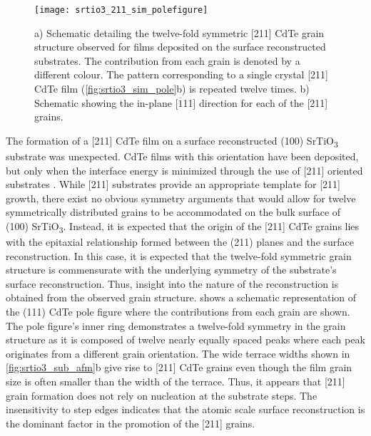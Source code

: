 \begin{figure}
 \centering \texttt{[image: srtio3\_211\_sim\_polefigure]}
 \caption[Simulated pole figure of CdTe on reconstructed SrTiO\textsubscript{3}]{\label{fig:srtio3_211_sim_polefigure}a) Schematic detailing the twelve-fold symmetric [211] CdTe grain structure observed for films deposited on the surface reconstructed substrates.
  The contribution from each grain is denoted by a different colour.
  The pattern corresponding to a single crystal [211] CdTe film (\cref{fig:srtio3_sim_pole}b) is repeated twelve times.
  b) Schematic showing the in-plane [\(\overline{1}\)11] direction for each of the [211] grains.}
\end{figure}

The formation of a [211] CdTe film on a surface reconstructed (100) SrTiO\textsubscript{3} substrate was unexpected.
CdTe films with this orientation have been deposited, but only when the interface energy is minimized through the use of [211] oriented substrates \cite{Lange1991b,Million1996,Rujirawat1997a,Zanatta1998}.
While [211] substrates provide an appropriate template for [211] growth, there exist no obvious symmetry arguments that would allow for twelve symmetrically distributed grains to be accommodated on the bulk surface of (100) SrTiO\textsubscript{3}.
Instead, it is expected that the origin of the [211] CdTe grains lies with the epitaxial relationship formed between the (211) planes and the surface reconstruction.
In this case, it is expected that the twelve-fold symmetric grain structure is commensurate with the underlying symmetry of the substrate's surface reconstruction.
Thus, insight into the nature of the reconstruction is obtained from the observed grain structure.
 shows a schematic representation of the (111) CdTe pole figure where the contributions from each grain are shown.
The pole figure's inner ring demonstrates a twelve-fold symmetry in the grain structure as it is composed of twelve nearly equally spaced peaks where each peak originates from a different grain orientation.
The wide terrace widths shown in \cref{fig:srtio3_sub_afm}b give rise to [211] CdTe grains even though the film grain size is often smaller than the width of the terrace.
Thus, it appears that [211] grain formation does not rely on nucleation at the substrate steps.
The insensitivity to step edges indicates that the atomic scale surface reconstruction is the dominant factor in the promotion of the [211] grains.

